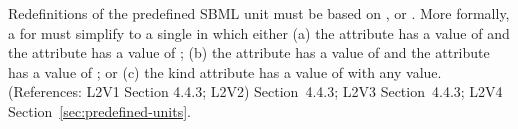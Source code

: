 Redefinitions of the predefined SBML unit  must be
based on ,  or .  More
formally, a \UnitDefinition for  must simplify to a single
\Unit in which either (a) the  attribute has
a value of  and the  attribute has a value of
; (b) the  attribute has a value of
 and the  attribute has a value of ; or
(c) the kind attribute has a value of  with
any  value.  (References: L2V1 Section 4.4.3; L2V2)
Section~4.4.3; L2V3 Section~4.4.3; L2V4
Section~\ref{sec:predefined-units}.
